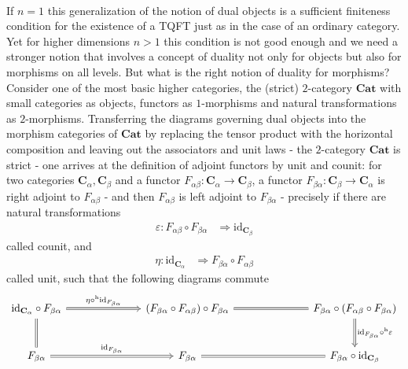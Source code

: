 \\
If $n = 1$ this generalization of the notion of dual objects is a sufficient finiteness condition for the existence of a TQFT just as in the case of an ordinary category. Yet for higher dimensions $n > 1$ this condition is not good enough and we need a stronger notion that involves a concept of duality not only for objects but also for morphisms on all levels. But what is the right notion of duality for morphisms? Consider one of the most basic higher categories, the (strict) $2$-category $\mathbf{Cat}$ with small categories as objects, functors as $1$-morphisms and natural transformations as $2$-morphisms. Transferring the diagrams governing dual objects into the morphism categories of $\mathbf{Cat}$ by replacing the tensor product with the horizontal composition and leaving out the associators and unit laws - the $2$-category $\mathbf{Cat}$ is strict - one arrives at the definition of adjoint functors by unit and counit: for two categories $\mathbf{C}_{\alpha},\mathbf{C}_{\beta}$ and a functor $F_{\alpha\beta} \colon \mathbf{C}_{\alpha} \to \mathbf{C}_{\beta}$, a functor $F_{\beta\alpha} \colon \mathbf{C}_{\beta} \to \mathbf{C}_{\alpha}$ is right adjoint to $F_{\alpha\beta}$ - and then $F_{\alpha\beta}$ is left adjoint to $F_{\beta\alpha}$ - precisely if there are natural transformations
\begin{align*}
  \varepsilon
  \colon
  F_{\alpha\beta}
  \circ
  F_{\beta\alpha}
  &\Rightarrow
  \mathrm{id}_{\mathbf{C}_{\beta}}
\end{align*}
called counit, and
\begin{align*}
  \eta
  \colon
  \mathrm{id}_{\mathbf{C}_{\alpha}}
  &\Rightarrow
  F_{\beta\alpha}
  \circ
  F_{\alpha\beta}
\end{align*}
called unit, such that the following diagrams commute
\begin{equation*}
\begin{tikzcd}[row sep=large,column sep=7em]
  \mathrm{id}_{\mathbf{C}_{\alpha}}
  \circ
  F_{\beta\alpha}
  \arrow[Rightarrow]{r}{\eta \circ^{\mathrm{h}} \mathrm{id}_{F_{\beta\alpha}}}
  &
  (F_{\beta\alpha} \circ F_{\alpha\beta})
  \circ
  F_{\beta\alpha}
  \arrow[equal]{r}
  &
  F_{\beta\alpha}
  \circ
  (F_{\alpha\beta} \circ F_{\beta\alpha})
  \arrow[Rightarrow]{d}{\mathrm{id}_{F_{\beta\alpha}} \circ^{\mathrm{h}} \varepsilon}
  \\
  F_{\beta\alpha}
  \arrow[equal]{u}
  \arrow[Rightarrow]{r}{\mathrm{id}_{F_{\beta\alpha}}}
  &
  F_{\beta\alpha}
  \arrow[equal]{r}
  &
  F_{\beta\alpha}
  \circ
  \mathrm{id}_{\mathbf{C}_{\beta}}
\end{tikzcd}
\end{equation*}
